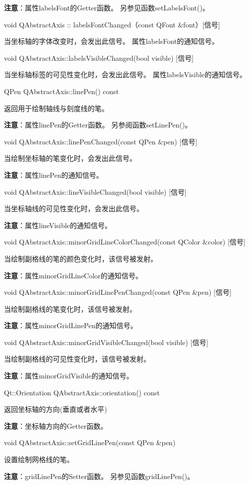 \textbf{注意}：属性labelsFont的Getter函数。 另参见函数setLabelsFont()。

void QAbstractAxis :: labelsFontChanged（const QFont \&font）[信号] 

当坐标轴的字体改变时，会发出此信号。 属性labelsFont的通知信号。

void QAbstractAxis::labelsVisibleChanged(bool visible) [信号] 

当坐标轴标签的可见性变化时，会发出此信号。 属性labelsVisible的通知信号。

QPen QAbstractAxis::linePen() const 

返回用于绘制轴线与刻度线的笔。 

\textbf{注意}：属性linePen的Getter函数。 另参阅函数setLinePen()。

void QAbstractAxis::linePenChanged(const QPen \&pen) [信号] 

当绘制坐标轴的笔变化时，会发出此信号。 

\textbf{注意}：属性linePen的通知信号。

void QAbstractAxis::lineVisibleChanged(bool visible) [信号] 

当坐标轴线的可见性变化时，会发出此信号。

\textbf{注意}：属性lineVisible的通知信号。

void QAbstractAxis::minorGridLineColorChanged(const QColor \&color)
[信号]

 当绘制副格线的笔的颜色变化时，该信号被发射。 

\textbf{注意}：属性minorGridLineColor的通知信号。

void QAbstractAxis::minorGridLinePenChanged(const QPen \&pen) [信号] 

当绘制副格线的笔变化时，该信号被发射。 

\textbf{注意}：属性minorGridLinePen的通知信号。

void QAbstractAxis::minorGridVisibleChanged(bool visible) [信号] 

当绘制副格线的可见性变化时，该信号被发射。 

\textbf{注意}：属性minorGridVisible的通知信号。

Qt::Orientation QAbstractAxis::orientation() const 

返回坐标轴的方向(垂直或者水平) 

\textbf{注意}：坐标轴方向的Getter函数。

void QAbstractAxis::setGridLinePen(const QPen \&pen) 

设置绘制网格线的笔。 

\textbf{注意}：gridLinePen的Setter函数。 另参见函数gridLinePen()。

